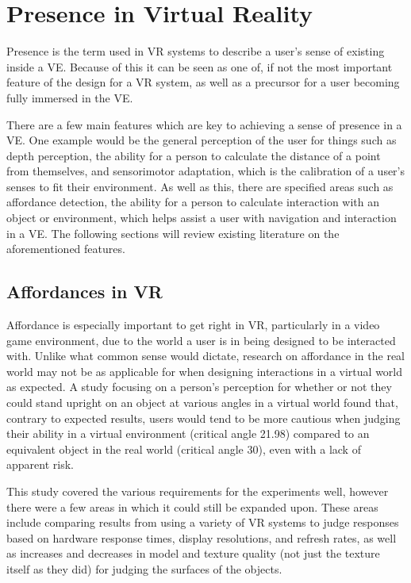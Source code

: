 \section{Presence in Virtual Reality}
\label{lr:vr}

	Presence is the term used in VR systems to describe a user's sense of existing inside a VE. Because of this it can be seen as one of, if not the most important feature of the design for a VR system, as well as a precursor for a user becoming fully immersed in the VE.

	There are a few main features which are key to achieving a sense of presence in a VE. One example would be the general perception of the user for things such as depth perception, the ability for a person to calculate the distance of a point from themselves, and sensorimotor adaptation, which is the calibration of a user's senses to fit their environment.
	As well as this, there are specified areas such as affordance detection, the ability for a person to calculate interaction with an object or environment, which helps assist a user with navigation and interaction in a VE.
	The following sections will review existing literature on the aforementioned features.

	\subsection{Affordances in VR}
	\label{lr:vr:affordances}
		Affordance is especially important to get right in VR, particularly in a video game environment, due to the world a user is in being designed to be interacted with.
		Unlike what common sense would dictate, research on affordance in the real world may not be as applicable for when designing interactions in a virtual world as expected.
		A study \cite{Regia-Corte2012} focusing on a person's perception for whether or not they could stand upright on an object at various angles in a virtual world found that, contrary to expected results, users would tend to be more cautious when judging their ability in a virtual environment (critical angle 21.98\degree) compared to an equivalent object in the real world (critical angle 30\degree), even with a lack of apparent risk.

		This study covered the various requirements for the experiments well, however there were a few areas in which it could still be expanded upon.
		These areas include comparing results from using a variety of VR systems to judge responses based on hardware response times, display resolutions, and refresh rates, as well as increases and decreases in model and texture quality (not just the texture itself as they did) for judging the surfaces of the objects.

